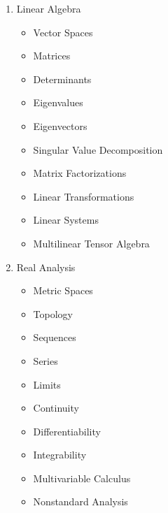 \documentclass[12pt]{article}
\begin{document}
\begin{enumerate}
    \item Linear Algebra 
    \begin{itemize}
        \item Vector Spaces
        \item Matrices
        \item Determinants
        \item Eigenvalues
        \item Eigenvectors
        \item Singular Value Decomposition
        \item Matrix Factorizations
        \item Linear Transformations
        \item Linear Systems
        \item Multilinear Tensor Algebra
    \end{itemize}

    \item Real Analysis 
    \begin{itemize}
        \item Metric Spaces
        \item Topology
        \item Sequences
        \item Series
        \item Limits
        \item Continuity
        \item Differentiability
        \item Integrability
        \item Multivariable Calculus
        \item Nonstandard Analysis
    \end{itemize}
\end{enumerate}
\end{document}
